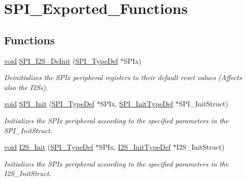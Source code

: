 \hypertarget{group___s_p_i___exported___functions}{}\section{S\+P\+I\+\_\+\+Exported\+\_\+\+Functions}
\label{group___s_p_i___exported___functions}
\subsection*{Functions}
\begin{DoxyCompactItemize}
\item 
\hyperlink{usb__devapi_8h_afabf60e7f57651d6d595a02c75f07cd0}{void} \hyperlink{group___s_p_i___exported___functions_gabe36880945fa56785283a9c0092124cc}{S\+P\+I\+\_\+\+I2\+S\+\_\+\+De\+Init} (\hyperlink{struct_s_p_i___type_def}{S\+P\+I\+\_\+\+Type\+Def} $\ast$S\+P\+Ix)
\begin{DoxyCompactList}\small\item\em Deinitializes the S\+P\+Ix peripheral registers to their default reset values (Affects also the I2\+Ss). \end{DoxyCompactList}\item 
\hyperlink{usb__devapi_8h_afabf60e7f57651d6d595a02c75f07cd0}{void} \hyperlink{group___s_p_i___exported___functions_ga8dacc1dc48bf08c0f12da409f4889037}{S\+P\+I\+\_\+\+Init} (\hyperlink{struct_s_p_i___type_def}{S\+P\+I\+\_\+\+Type\+Def} $\ast$S\+P\+Ix, \hyperlink{struct_s_p_i___init_type_def}{S\+P\+I\+\_\+\+Init\+Type\+Def} $\ast$S\+P\+I\+\_\+\+Init\+Struct)
\begin{DoxyCompactList}\small\item\em Initializes the S\+P\+Ix peripheral according to the specified parameters in the S\+P\+I\+\_\+\+Init\+Struct. \end{DoxyCompactList}\item 
\hyperlink{usb__devapi_8h_afabf60e7f57651d6d595a02c75f07cd0}{void} \hyperlink{group___s_p_i___exported___functions_ga53661884ae4a9640df7cbc59187782f7}{I2\+S\+\_\+\+Init} (\hyperlink{struct_s_p_i___type_def}{S\+P\+I\+\_\+\+Type\+Def} $\ast$S\+P\+Ix, \hyperlink{struct_i2_s___init_type_def}{I2\+S\+\_\+\+Init\+Type\+Def} $\ast$I2\+S\+\_\+\+Init\+Struct)
\begin{DoxyCompactList}\small\item\em Initializes the S\+P\+Ix peripheral according to the specified parameters in the I2\+S\+\_\+\+Init\+Struct. \end{DoxyCompactList}\item 

\end{DoxyCompactItemize}
